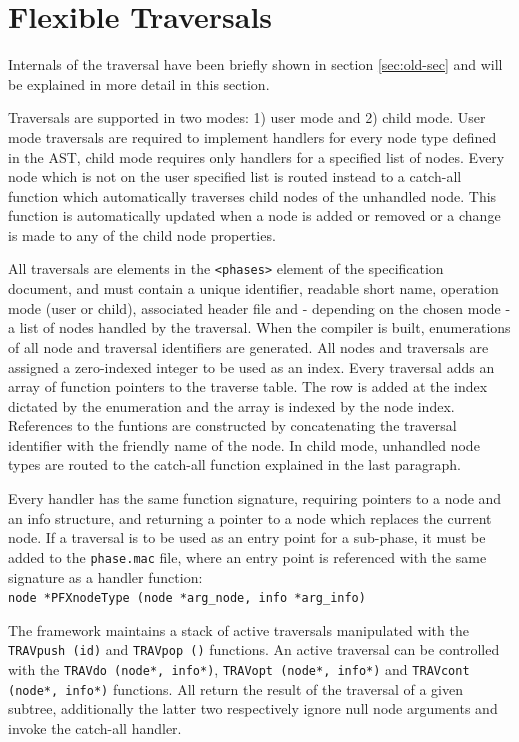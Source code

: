 \documentclass[twoside,openright]{uva-bachelor-thesis}
\newcommand{\code}[1]{\texttt{\footnotesize#1}}
\begin{document}
	\section{Flexible Traversals}
			Internals of the traversal have been briefly shown in section \ref{sec:old-sec} and will be explained in more detail in this section. 
			
			Traversals are supported in two modes: 1) user mode and 2) child mode. User mode traversals are required to implement handlers for every node type defined in the AST, child mode requires only handlers for a specified list of nodes. Every node which is not on the user specified list is routed instead to a catch-all function which automatically traverses child nodes of the unhandled node. This function is automatically updated when a node is added or removed or a change is made to any of the child node properties.
			
			All traversals are elements in the \code{<phases>} element of the specification document, and must contain a unique identifier, readable short name, operation mode (user or child), associated header file and - depending on the chosen mode - a list of nodes handled by the traversal. When the compiler is built, enumerations of all node and traversal identifiers are generated. All nodes and traversals are assigned a zero-indexed integer to be used as an index. Every traversal adds an array of function pointers to the traverse table. The row is added at the index dictated by the enumeration and the array is indexed by the node index. References to the funtions are constructed by concatenating the traversal identifier with the friendly name of the node. In child mode, unhandled node types are routed to the catch-all function explained in the last paragraph.
			
			Every handler has the same function signature, requiring pointers to a node and an info structure, and returning a pointer to a node which replaces the current node. If a traversal is to be used as an entry point for a sub-phase, it must be added to the \code{phase.mac} file, where an entry point is referenced with the same signature as a handler function: \\
			\code{node *PFXnodeType (node *arg\_node, info *arg\_info)}
						
			The framework maintains a stack of active traversals manipulated with the \code{TRAVpush (id)} and \code{TRAVpop ()} functions. An active traversal can be controlled with the \code{TRAVdo (node*, info*)}, \code{TRAVopt (node*, info*)} and \code{TRAVcont (node*, info*)} functions. All return the result of the traversal of a given subtree, additionally the latter two respectively ignore null node arguments and invoke the catch-all handler.
			
\end{document}
